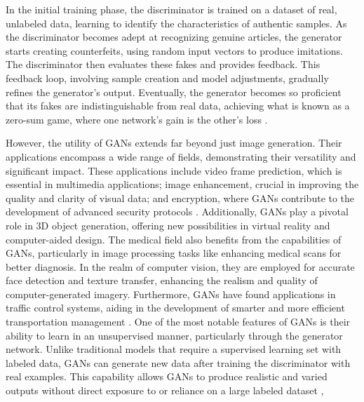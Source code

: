 In the initial training phase, the discriminator is trained on a dataset of real, unlabeled data, learning to identify the characteristics of authentic samples. As the discriminator becomes adept at recognizing genuine articles, the generator starts creating counterfeits, using random input vectors to produce imitations. The discriminator then evaluates these fakes and provides feedback. This feedback loop, involving sample creation and model adjustments, gradually refines the generator's output. Eventually, the generator becomes so proficient that its fakes are indistinguishable from real data, achieving what is known as a zero-sum game, where one network's gain is the other's loss \citep{goodfellowGAN}.

However, the utility of GANs extends far beyond just image generation. Their applications encompass a wide range of fields, demonstrating their versatility and significant impact. These applications include video frame prediction, which is essential in multimedia applications; image enhancement, crucial in improving the quality and clarity of visual data; and encryption, where GANs contribute to the development of advanced security protocols \citep{goodfellowGAN}. Additionally, GANs play a pivotal role in 3D object generation, offering new possibilities in virtual reality and computer-aided design. The medical field also benefits from the capabilities of GANs, particularly in image processing tasks like enhancing medical scans for better diagnosis. In the realm of computer vision, they are employed for accurate face detection and texture transfer, enhancing the realism and quality of computer-generated imagery. Furthermore, GANs have found applications in traffic control systems, aiding in the development of smarter and more efficient transportation management \citep{AGGARWAL2021100004}. One of the most notable features of GANs is their ability to learn in an unsupervised manner, particularly through the generator network. Unlike traditional models that require a supervised learning set with labeled data, GANs can generate new data after training the discriminator with real examples. This capability allows GANs to produce realistic and varied outputs without direct exposure to or reliance on a large labeled dataset \citep{GoodfellowDeepLearning},

